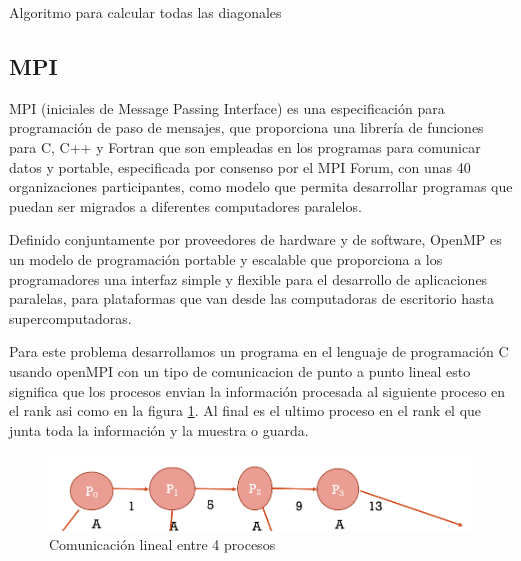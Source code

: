 \documentclass[10pt]{IEEEtran}
\begin{document}
\begin{algorithm}
  \label{algoFinal}
  \SetAlgoLined
  \caption{Algoritmo para calcular todas las diagonales}
\end{algorithm}

\subsection{MPI}
MPI (iniciales de Message Passing Interface) es una especificación para programación de paso de mensajes, que proporciona una librería de funciones para C, C++ y Fortran que son empleadas en los programas para comunicar datos y portable, especificada por consenso por el MPI Forum, con unas 40 organizaciones participantes, como modelo que permita desarrollar programas que puedan ser migrados a diferentes computadores paralelos.

Definido conjuntamente por proveedores de hardware y de software, OpenMP es un modelo de programación portable y escalable que proporciona a los programadores una interfaz simple y flexible para el desarrollo de aplicaciones paralelas, para plataformas que van desde las computadoras de escritorio hasta supercomputadoras.

Para este problema desarrollamos un programa en el lenguaje de programación C usando openMPI con un tipo de comunicacion de punto a punto lineal esto significa que los procesos envian la información procesada al siguiente proceso en el rank asi como en la figura \ref{fig:lineal}. Al final es el ultimo proceso en el rank el que junta toda la información y la muestra o guarda.

\begin{figure}
  \centering
  \includegraphics[width=0.8\linewidth]{lineal.png}
  \caption{Comunicación lineal entre 4 procesos}%
  \label{fig:lineal}
\end{figure}
\end{document}
